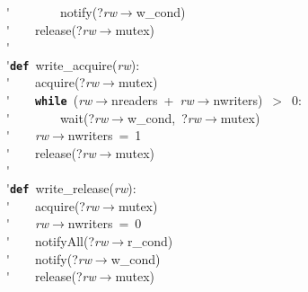 \'\>~~~~~~~~notify(?\textit{rw}$\rightarrow$w\_cond)\\

\'\>~~~~release(?\textit{rw}$\rightarrow$mutex)\\

\'\>\\

\'\>\texttt{\textbf{def}}~write\_acquire(\textit{rw}):\\

\'\>~~~~acquire(?\textit{rw}$\rightarrow$mutex)\\

\'\>~~~~\texttt{\textbf{while}}~(\textit{rw}$\rightarrow$nreaders~+~\textit{rw}$\rightarrow$nwriters)~$>$~0:\\

\'\>~~~~~~~~wait(?\textit{rw}$\rightarrow$w\_cond,~?\textit{rw}$\rightarrow$mutex)\\

\'\>~~~~\textit{rw}$\rightarrow$nwriters~=~1\\

\'\>~~~~release(?\textit{rw}$\rightarrow$mutex)\\

\'\>\\

\'\>\texttt{\textbf{def}}~write\_release(\textit{rw}):\\

\'\>~~~~acquire(?\textit{rw}$\rightarrow$mutex)\\

\'\>~~~~\textit{rw}$\rightarrow$nwriters~=~0\\

\'\>~~~~notifyAll(?\textit{rw}$\rightarrow$r\_cond)\\

\'\>~~~~notify(?\textit{rw}$\rightarrow$w\_cond)\\

\'\>~~~~release(?\textit{rw}$\rightarrow$mutex)
